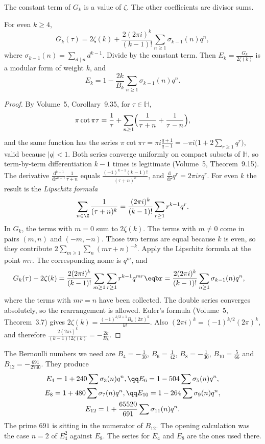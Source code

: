 The constant term of $G_k$ is a value of $\zeta$. The other coefficients are divisor sums.

\begin{theorem}\label{thm:eisensteinq}
For even $k\ge4$,
\[
G_k(\tau)=2\zeta(k)+\frac{2(2\pi i)^k}{(k-1)!}\sum_{n\ge1}\sigma_{k-1}(n)q^n,
\]
where $\sigma_{k-1}(n)=\sum_{d\mid n}d^{k-1}$. Divide by the constant term. Then $E_k=\frac{G_k}{2\zeta(k)}$ is a modular form of weight $k$, and
\[
E_k=1-\frac{2k}{B_k}\sum_{n\ge1}\sigma_{k-1}(n)q^n.
\]
\end{theorem}

\begin{proof}
By Volume~5, Corollary~9.35, for $\tau\in\mathbb H$,
\[
\pi\cot\pi\tau=\frac1\tau+\sum_{n\ge1}\Bigl(\frac1{\tau+n}+\frac1{\tau-n}\Bigr),
\]
and the same function has the series $\pi\cot\pi\tau=\pi i\frac{q+1}{q-1}=-\pi i\bigl(1+2\sum_{r\ge1}q^r\bigr)$, valid because $|q|<1$. Both series converge uniformly on compact subsets of $\mathbb H$, so term-by-term differentiation $k-1$ times is legitimate (Volume~5, Theorem~9.15). The derivative $\frac{\mathrm d^{k-1}}{\mathrm d\tau^{k-1}}\frac1{\tau+n}$ equals $\frac{(-1)^{k-1}(k-1)!}{(\tau+n)^k}$, and $\frac{\mathrm d}{\mathrm d\tau}q^r=2\pi irq^r$. For even $k$ the result is the \emph{Lipschitz formula}
\[
\sum_{n\in\Z}\frac1{(\tau+n)^k}=\frac{(2\pi i)^k}{(k-1)!}\sum_{r\ge1}r^{k-1}q^r.
\]
In $G_k$, the terms with $m=0$ sum to $2\zeta(k)$. The terms with $m\ne0$ come in pairs $(m,n)$ and $(-m,-n)$. Those two terms are equal because $k$ is even, so they contribute $2\sum_{m\ge1}\sum_n(m\tau+n)^{-k}$. Apply the Lipschitz formula at the point $m\tau$. The corresponding nome is $q^m$, and
\[
\begin{aligned}G_k(\tau)-2\zeta(k)&=\frac{2(2\pi i)^k}{(k-1)!}\sum_{m\ge1}\sum_{r\ge1}r^{k-1}q^{mr}\eqbr=\frac{2(2\pi i)^k}{(k-1)!}\sum_{n\ge1}\sigma_{k-1}(n)q^n,\end{aligned}
\]
where the terms with $mr=n$ have been collected. The double series converges absolutely, so the rearrangement is allowed. Euler's formula (Volume~5, Theorem~3.7) gives $2\zeta(k)=\frac{(-1)^{k/2+1}B_k(2\pi)^k}{k!}$. Also $(2\pi i)^k=(-1)^{k/2}(2\pi)^k$, and therefore $\frac{2(2\pi i)^k}{(k-1)!\,2\zeta(k)}=-\frac{2k}{B_k}$.
\end{proof}

The Bernoulli numbers we need are $B_4=-\frac1{30}$, $B_6=\frac1{42}$, $B_8=-\frac1{30}$, $B_{10}=\frac5{66}$ and $B_{12}=-\frac{691}{2730}$. They produce
\[
\begin{gathered}E_4=1+240\sum\sigma_3(n)q^n,\qq E_6=1-504\sum\sigma_5(n)q^n,\\E_8=1+480\sum\sigma_7(n)q^n,\qq E_{10}=1-264\sum\sigma_9(n)q^n,\\E_{12}=1+\frac{65520}{691}\sum\sigma_{11}(n)q^n.\end{gathered}
\]
The prime $691$ is sitting in the numerator of $B_{12}$. The opening calculation was the case $n=2$ of $E_4^2$ against $E_8$. The series for $E_4$ and $E_8$ are the ones used there.

